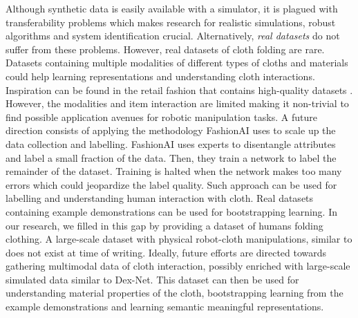\documentclass[\home/main.tex]{subfiles}
\begin{document}
Although synthetic data is easily available with a simulator, it is plagued with transferability problems which makes research for realistic simulations, robust algorithms and system identification crucial. Alternatively, \emph{real datasets} do not suffer from these problems. However, real datasets of cloth folding are rare. Datasets containing multiple modalities of different types of cloths and materials could help learning representations and understanding cloth interactions. Inspiration can be found in the retail fashion that contains high-quality datasets \autocite{DeepFashion, DeepFashion2, FashionAI}. However, the modalities and item interaction are limited making it non-trivial to find possible application avenues for robotic manipulation tasks. A future direction consists of applying the methodology FashionAI \autocite{FashionAI} uses to scale up the data collection and labelling. FashionAI uses experts to disentangle attributes and label a small fraction of the data. Then, they train a network to label the remainder of the dataset. Training is halted when the network makes too many errors which could jeopardize the label quality. Such approach can be used for labelling and understanding human interaction with cloth. 
Real datasets containing example demonstrations can be used for bootstrapping learning. In our research, we filled in this gap by providing a dataset of humans folding clothing. A large-scale dataset with physical robot-cloth manipulations, similar to \autocite{Levine2016} does not exist at time of writing. Ideally, future efforts are directed towards gathering multimodal data of cloth interaction, possibly enriched with large-scale simulated data similar to Dex-Net. This dataset can then be used for understanding material properties of the cloth, bootstrapping learning from the example demonstrations and learning semantic meaningful representations.
\end{document}
